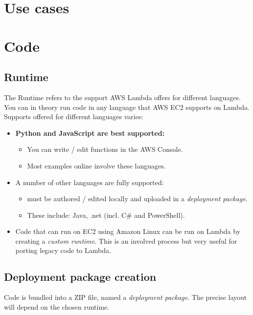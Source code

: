 \documentclass[slides]{pgnotes}
\begin{document}
\section{Use cases}





\section{Code}\label{code}

\subsection{Runtime}\label{runtime}

The Runtime refers to the support AWS Lambda offers for different
languages. You can in theory run code in any language that AWS EC2
supports on Lambda. Supports offered for different languages varies:

\begin{itemize}
\item
  \textbf{Python and JavaScript are best supported:}
  \begin{itemize}
  \item You can write / edit functions in the AWS Console.
  \item Most examples online involve these languages.
  \end{itemize}
\item
  A number of other languages are fully supported:
  \begin{itemize}
  \item must be authored / edited locally and uploaded in a \emph{deployment package}.
  \item These include: Java, .net (incl. C\# and PowerShell).
  \end{itemize}
\item
  Code that can run on EC2 using Amazon Linux can be run on Lambda by
  creating a \emph{custom runtime}. This is an involved process but very
  useful for porting legacy code to Lambda.
\end{itemize}

\subsection{Deployment package creation}\label{deployment-package-creation}

Code is bundled into a ZIP file, named a \emph{deployment package}. The
precise layout will depend on the chosen runtime.
\end{document}
